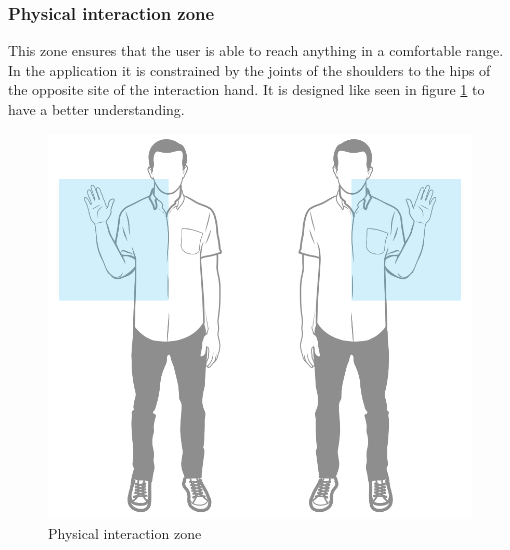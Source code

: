 \subsubsection{Physical interaction zone}
This zone ensures that the user is able to reach anything in a comfortable range. In the application it is constrained by the joints of the shoulders to the hips of the opposite site of the interaction hand. It is designed like seen in figure \ref{fig:higPHIZ} to have a better understanding.
\begin{figure}[htb]
	\centering
	\begin{minipage}[t]{1\linewidth}
		\centering
		\includegraphics[width=0.5\linewidth]{Pictures/higPHIZ}
		\caption{Physical interaction zone~\cite{MicrosoftHIG2014-mh}}
		\label{fig:higPHIZ}
	\end{minipage}
\end{figure}

